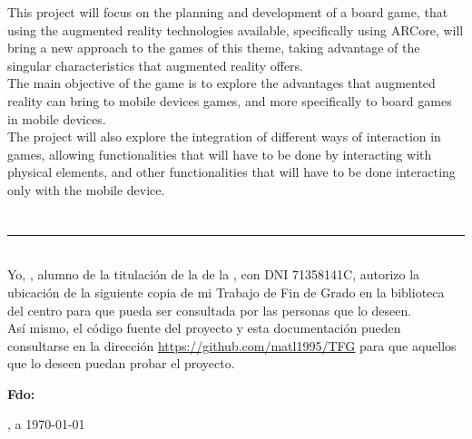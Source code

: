 {{This project will focus on the planning and development of a board game, that using the augmented reality technologies available, specifically using ARCore, will bring a new approach to the games of this theme, taking advantage of the singular characteristics that augmented reality offers.\\

The main objective of the game is to explore the advantages that augmented reality can bring to mobile devices games, and more specifically to board games in mobile devices.\\

The project will also explore the integration of different ways of interaction in games, allowing functionalities that will have to be done by interacting with physical elements, and other functionalities that will have to be done interacting only with the mobile device.\\

\chapter*{}
\thispagestyle{empty}

\noindent\rule[-1ex]{\textwidth}{2pt}\\[4.5ex]

Yo, \textbf{\autor}, alumno de la titulación \textbf{\grado} de la \textbf{\escuela} de la \textbf{\universidad}, con DNI 71358141C, autorizo la ubicación de la siguiente copia de mi Trabajo de Fin de Grado en la biblioteca del centro para que pueda ser consultada por las personas que lo deseen.\\

Así mismo, el código fuente del proyecto y esta documentación pueden consultarse en la dirección \url{https://github.com/matl1995/TFG} para que aquellos que lo deseen puedan probar el proyecto.

\vspace{5cm}

\noindent \textbf{Fdo: \autor}

\vspace{2cm}

\begin{flushright}
\ciudad, a \today
\end{flushright}

\chapter*{}
\thispagestyle{empty}

}}
